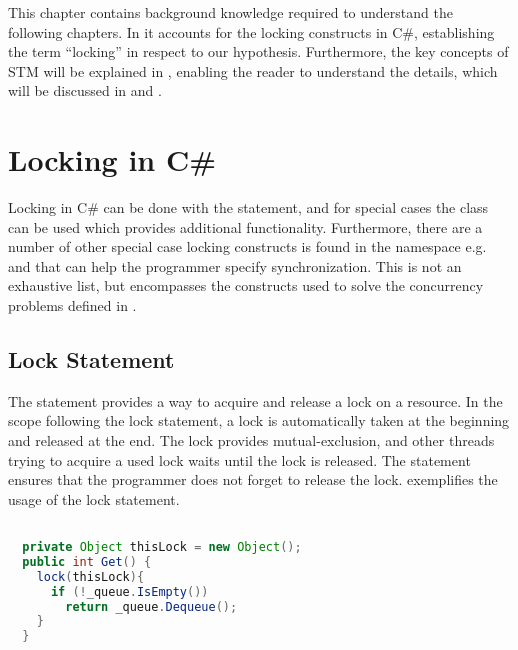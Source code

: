 \makeatletter {}\makeatother
{}
This chapter contains background knowledge required to understand the following chapters. In  it accounts for the locking constructs in C\#, establishing the term ``locking''  in respect to our hypothesis. Furthermore, the key concepts of \ac{STM} will be explained in , enabling the reader to understand the details, which will be discussed in  and .
\label{chap:prelim}
\section{Locking in C\#}\label{sec:locking}
Locking in C\# can be done with the  statement, and for special cases the  class can be used which provides additional functionality. Furthermore, there are a number of other special case locking constructs is found in the  namespace e.g. \cite{microsoftSyncPrim,}    and  that can help the programmer specify synchronization. This is not an exhaustive list, but encompasses the constructs used to solve the concurrency problems defined in .
\subsection{Lock Statement}\label{subsec:lock_statement}
The  statement\cite[p. 102]{csharp2013specificaiton} provides a way to acquire and release a lock on a resource. In the scope following the lock statement, a lock is automatically taken at the beginning and released at the end. The lock provides mutual-exclusion, and other threads trying to acquire a used lock waits until the lock is released. The  statement ensures that the programmer does not forget to release the lock.  exemplifies the usage of the lock statement. 
\begin{lstlisting}[label=lst:lock_statement,
  caption={Lock Statement},
  language=Java,  
  showspaces=false,
  showtabs=false,
  breaklines=true,
  showstringspaces=false,
  breakatwhitespace=true,
  commentstyle=\color{greencomments},
  keywordstyle=\color{bluekeywords},
  stringstyle=\color{redstrings},
  morekeywords={atomic, retry, orElse}]  % Start your code-block

  private Object thisLock = new Object();
  public int Get() { 
    lock(thisLock){
      if (!_queue.IsEmpty())
        return _queue.Dequeue();
    }
  }
\end{lstlisting}
